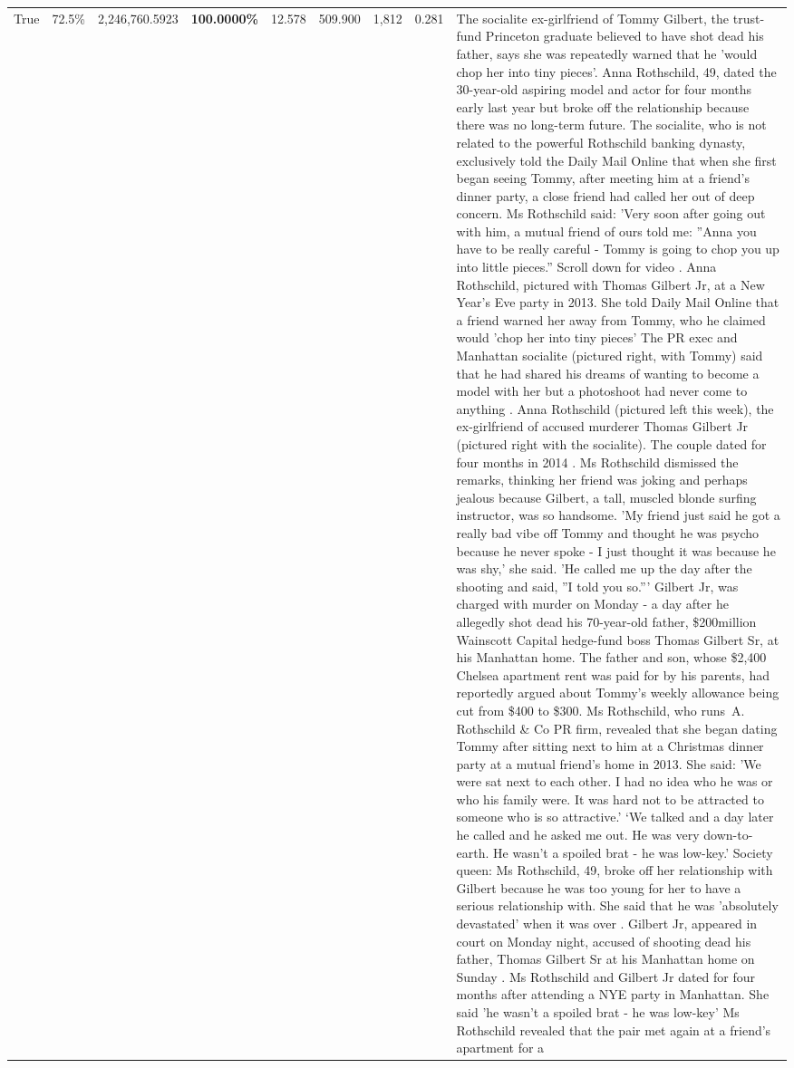 \begin{table}[H]
\begin{tabular}{lllrlllll}
True & 72.5\% & 2,246,760.5923 & \bfseries \color{red} 100.0000\% & 12.578 & 509.900 & 1,812 & 0.281 & The socialite ex-girlfriend of Tommy Gilbert, the trust-fund Princeton graduate believed to have shot dead his father, says she was repeatedly warned that he 'would chop her into tiny pieces'. Anna Rothschild, 49, dated the 30-year-old aspiring model and actor for four months early last year but broke off the relationship because there was no long-term future. The socialite, who is not related to the powerful Rothschild banking dynasty, exclusively told the Daily Mail Online that when she first began seeing Tommy, after meeting him at a friend's dinner party, a close friend had called her out of deep concern. Ms Rothschild said: 'Very soon after going out with him, a mutual friend of ours told me: ''Anna you have to be really careful - Tommy is going to chop you up into little pieces.'' Scroll down for video . Anna Rothschild, pictured with Thomas Gilbert Jr, at a New Year's Eve party in 2013. She told Daily Mail Online that a friend warned her away from Tommy, who he claimed would 'chop her into tiny pieces' The PR exec and Manhattan socialite (pictured right, with Tommy) said that he had shared his dreams of wanting to become a model with her but a photoshoot had never come to anything . Anna Rothschild (pictured left this week), the ex-girlfriend of accused murderer Thomas Gilbert Jr (pictured right with the socialite). The couple dated for four months in 2014 . Ms Rothschild dismissed the remarks, thinking her friend was joking and perhaps jealous because Gilbert, a tall, muscled blonde surfing instructor, was so handsome. 'My friend just said he got a really bad vibe off Tommy and thought he was psycho because he never spoke - I just thought it was because he was shy,' she said. 'He called me up the day after the shooting and said, ''I told you so.''' Gilbert Jr, was charged with murder on Monday - a day after he allegedly shot dead his 70-year-old father, \$200million Wainscott Capital hedge-fund boss Thomas Gilbert Sr, at his Manhattan home. The father and son, whose \$2,400 Chelsea apartment rent was paid for by his parents, had reportedly argued about Tommy's weekly allowance being cut from \$400 to \$300. Ms Rothschild, who runs A. Rothschild \& Co PR firm, revealed that she began dating Tommy after sitting next to him at a Christmas dinner party at a mutual friend's home in 2013. She said: 'We were sat next to each other. I had no idea who he was or who his family were. It was hard not to be attracted to someone who is so attractive.' ‘We talked and a day later he called and he asked me out. He was very down-to-earth. He wasn’t a spoiled brat - he was low-key.’ Society queen: Ms Rothschild, 49, broke off her relationship with Gilbert because he was too young for her to have a serious relationship with. She said that he was 'absolutely devastated' when it was over . Gilbert Jr, appeared in court on Monday night, accused of shooting dead his father, Thomas Gilbert Sr at his Manhattan home on Sunday . Ms Rothschild and Gilbert Jr dated for four months after attending a NYE party in Manhattan. She said 'he wasn't a spoiled brat - he was low-key' Ms Rothschild revealed that the pair met again at a friend’s apartment for a 
\end{tabular}
\end{table}
